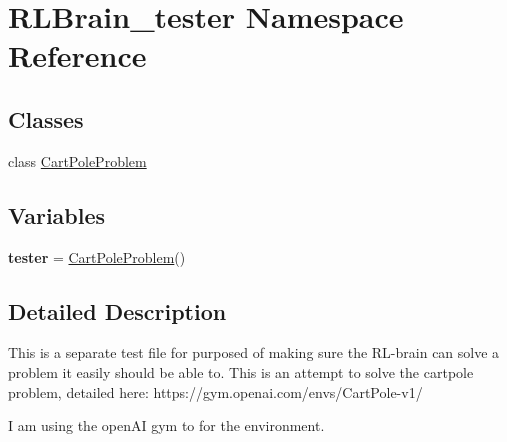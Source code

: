 \hypertarget{namespaceRLBrain__tester}{}\section{R\+L\+Brain\+\_\+tester Namespace Reference}
\label{namespaceRLBrain__tester}
\subsection*{Classes}
\begin{DoxyCompactItemize}
\item 
class \hyperlink{classRLBrain__tester_1_1CartPoleProblem}{Cart\+Pole\+Problem}
\end{DoxyCompactItemize}
\subsection*{Variables}
\begin{DoxyCompactItemize}
\item 
{\bfseries tester} = \hyperlink{classRLBrain__tester_1_1CartPoleProblem}{Cart\+Pole\+Problem}()\hypertarget{namespaceRLBrain__tester_a4bbd89f0d985d2e296a620f47d4d979b}{}\label{namespaceRLBrain__tester_a4bbd89f0d985d2e296a620f47d4d979b}

\end{DoxyCompactItemize}


\subsection{Detailed Description}
\begin{DoxyVerb}This is a separate test file for purposed of making sure the RL-brain can solve a problem it easily should be able to.
This is an attempt to solve the cartpole problem, detailed here: https://gym.openai.com/envs/CartPole-v1/

I am using the openAI gym to for the environment.
\end{DoxyVerb}
 